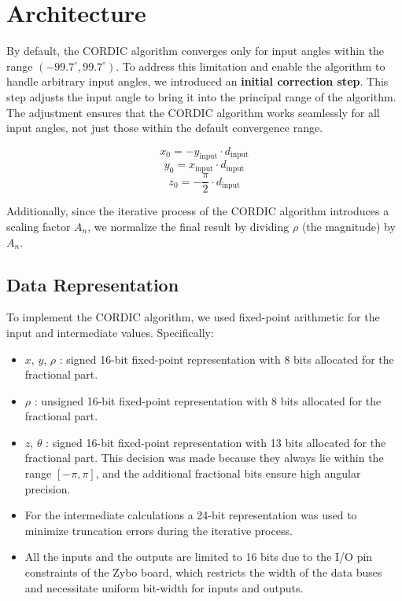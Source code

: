 \chapter{Architecture}


By default, the CORDIC algorithm converges only for input angles within the range \( (-99.7^\circ, 99.7^\circ) \).
To address this limitation and enable the algorithm to handle arbitrary input angles, we introduced an \textbf{initial correction step}. This step adjusts the input angle to bring it into the principal range of the algorithm. The adjustment ensures that the CORDIC algorithm works seamlessly for all input angles, not just those within the default convergence range.

\[
    x_0 = -y_{\text{input}} \cdot d_{\text{input}}
\]
\[
    y_0 =  x_{\text{input}} \cdot d_{\text{input}}
\]
\[
    z_0 = -\frac{\pi}{2} \cdot d_{\text{input}}
\]

Additionally, since the iterative process of the CORDIC algorithm introduces a scaling factor \( A_n \), we normalize the final result by dividing \( \rho \) (the magnitude) by \( A_n \).

\section{Data Representation}

To implement the CORDIC algorithm, we used fixed-point arithmetic for the input and intermediate values. Specifically:

\begin{itemize}
    \item \( x \), \( y \), \( \rho \) : signed 16-bit fixed-point representation with 8 bits allocated for the fractional part.
    \item \( \rho \) : unsigned 16-bit fixed-point representation with 8 bits allocated for the fractional part.
    \item \( z \), \( \theta \) : signed 16-bit fixed-point representation with 13 bits allocated for the fractional part. This decision was made because they always lie within the range \( [-\pi, \pi] \), and the additional fractional bits ensure high angular precision.
    \item For the intermediate calculations a 24-bit representation was used to minimize truncation errors during the iterative process. 
    \item All the inputs and the outputs are limited to 16 bits due to the I/O pin constraints of the Zybo board, which restricts the width of the data buses and necessitate uniform bit-width for inputs and outputs.
\end{itemize}

